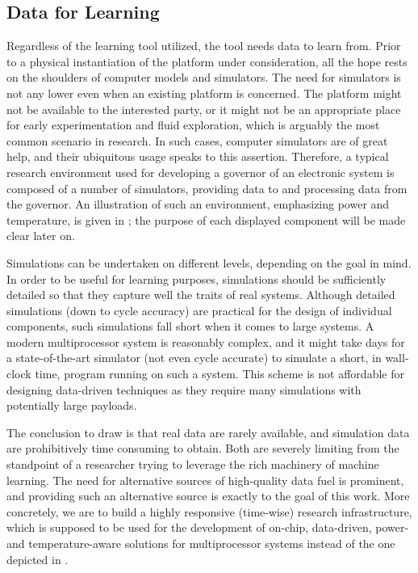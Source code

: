 \subsection{Data for Learning}

Regardless of the learning tool utilized, the tool needs data to learn from.
Prior to a physical instantiation of the platform under consideration, all the
hope rests on the shoulders of computer models and simulators. The need for
simulators is not any lower even when an existing platform is concerned. The
platform might not be available to the interested party, or it might not be an
appropriate place for early experimentation and fluid exploration, which is
arguably the most common scenario in research. In such cases, computer
simulators are of great help, and their ubiquitous usage speaks to this
assertion. Therefore, a typical research environment used for developing a
governor of an electronic system is composed of a number of simulators,
providing data to and processing data from the governor. An illustration of such
an environment, emphasizing power and temperature, is given in ;
the purpose of each displayed component will be made clear later on.

Simulations can be undertaken on different levels, depending on the goal in
mind. In order to be useful for learning purposes, simulations should be
sufficiently detailed so that they capture well the traits of real systems.
Although detailed simulations (down to cycle accuracy) are practical for the
design of individual components, such simulations fall short when it comes to
large systems. A modern multiprocessor system is reasonably complex, and it
might take days for a state-of-the-art simulator (not even cycle accurate) to
simulate a short, in wall-clock time, program running on such a system. This
scheme is not affordable for designing data-driven techniques as they require
many simulations with potentially large payloads.

The conclusion to draw is that real data are rarely available, and simulation
data are prohibitively time consuming to obtain. Both are severely limiting from
the standpoint of a researcher trying to leverage the rich machinery of machine
learning. The need for alternative sources of high-quality data fuel is
prominent, and providing such an alternative source is exactly to the goal of
this work. More concretely, we are to build a highly responsive (time-wise)
research infrastructure, which is supposed to be used for the development of
on-chip, data-driven, power- and temperature-aware solutions for multiprocessor
systems instead of the one depicted in .
